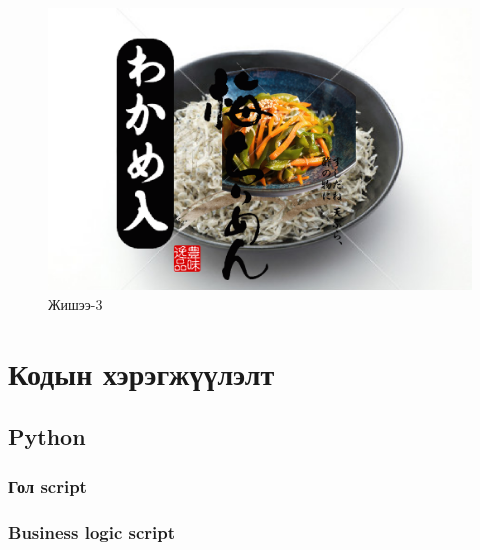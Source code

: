 \begin{figure}
	\centering
	\includegraphics[scale=2]{src/pictures/zurag3.png}
	\caption{Жишээ-3}
\end{figure}

\chapter{Кодын хэрэгжүүлэлт}
\section{Python}
\subsection{Гол script}

\subsection{Business logic script}

